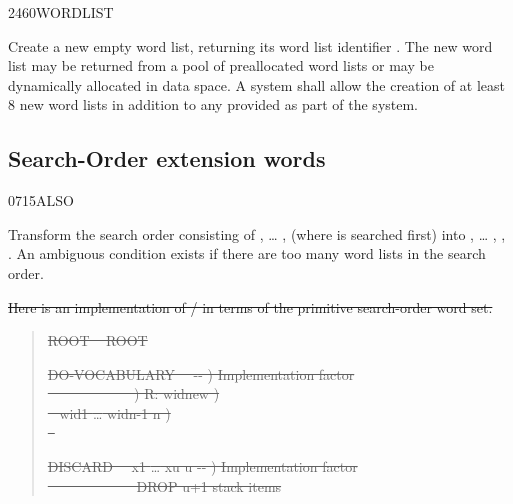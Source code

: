 \begin{worddef}{2460}{WORDLIST}
\item {}

	Create a new empty word list, returning its word list identifier
	. The new word list may be returned from a pool of
	preallocated word lists or may be dynamically allocated in data
	space. A system shall allow the creation of at least 8 new word
	lists in addition to any provided as part of the system.
\end{worddef}


\subsection{Search-Order extension words} %
\extended

\begin{worddef}{0715}{ALSO}
\item \stack{}{}

	Transform the search order consisting of , {\ldots}
	,  (where  is searched
	first) into , {\ldots} , ,
	. An ambiguous condition exists if there are too
	many word lists in the search order.

\see {}

	\begin{rationale} %
\cbstart{}
\sout{%
		Here is an implementation of / in terms
		of the primitive search-order word set.}

		\begin{quote}\ttfamily
		\sout{  ROOT ~
		ROOT }

		\sout{\word{:} DO-VOCABULARY~~ -{}- )
			 Implementation factor} \\
		\sout{\tab{}~~ 
				~~~~~~~~~\word{p} )  R: widnew )} \\
		\sout{\tab~  
				 wid1 {\ldots} widn-1 n )} \\
		\sout{\tab~  } \\
		\sout{\word{;}}

		\sout{\word{:} DISCARD~~ x1 {\ldots} xu u -{}- )
			 Implementation factor} \\
		\sout{   
			~~~~~~~~~~~~ DROP u+1 stack items} \\
		\sout{\word{;}}


\end{quote}
\end{rationale}
\end{worddef}
